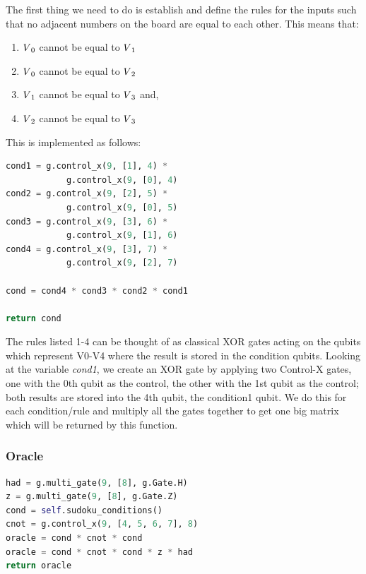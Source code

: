 \documentclass{article}
\begin{document}

The first thing we need to do is establish and define the rules for the inputs such that no adjacent numbers on the board are equal to each other. This means that:
\begin{enumerate}
    \item $V\textsubscript{0}$ cannot be equal to $V\textsubscript{1}$
    \item $V\textsubscript{0}$ cannot be equal to $V\textsubscript{2}$
    \item $V\textsubscript{1}$ cannot be equal to $V\textsubscript{3}$ and, 
    \item $V\textsubscript{2}$ cannot be equal to $V\textsubscript{3}$
\end{enumerate}

This is implemented as follows:

\begin{file}
\begin{lstlisting}[language=Python]
cond1 = g.control_x(9, [1], 4) * 
            g.control_x(9, [0], 4)
cond2 = g.control_x(9, [2], 5) * 
            g.control_x(9, [0], 5)
cond3 = g.control_x(9, [3], 6) * 
            g.control_x(9, [1], 6)
cond4 = g.control_x(9, [3], 7) * 
            g.control_x(9, [2], 7)

cond = cond4 * cond3 * cond2 * cond1

return cond
\end{lstlisting}
\end{file}

The rules listed 1-4 can be thought of as classical XOR gates acting on the qubits which represent V0-V4 where the result is stored in the condition qubits. Looking at the variable \textit{cond1}, we create an XOR gate by applying two Control-X gates, one with the 0th qubit as the control, the other with the 1st qubit as the control; both results are stored into the 4th qubit, the condition1 qubit. 
We do this for each condition/rule and multiply all the gates together to get one big matrix which will be returned by this function.

\subsubsection{Oracle}
\begin{file}
\begin{lstlisting}[language=Python]
had = g.multi_gate(9, [8], g.Gate.H)
z = g.multi_gate(9, [8], g.Gate.Z)
cond = self.sudoku_conditions()
cnot = g.control_x(9, [4, 5, 6, 7], 8)
oracle = cond * cnot * cond
oracle = cond * cnot * cond * z * had
return oracle
\end{lstlisting}
\end{file}
\end{document}
